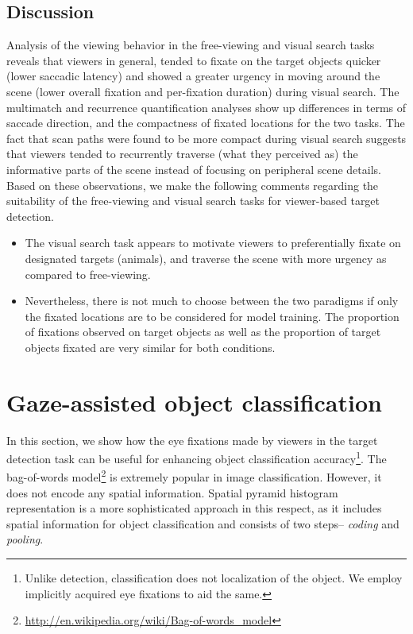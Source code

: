 \documentclass{article}
\begin{document}
\subsection{Discussion}
Analysis of the viewing behavior in the free-viewing and visual search tasks reveals that viewers in general, tended to fixate on the target objects quicker (lower saccadic latency) and showed a greater urgency in moving around the scene (lower overall fixation and per-fixation duration) during visual search. The multimatch and recurrence quantification analyses show up differences in terms of saccade direction, and the compactness of fixated locations for the two tasks. The fact that scan paths were found to be more compact during visual search suggests that viewers tended to recurrently traverse (what they perceived as) the informative parts of the scene instead of focusing on peripheral scene details. Based on these observations, we make the following comments regarding the suitability of the free-viewing and visual search tasks for viewer-based target detection. 

\begin{itemize}[noitemsep,nolistsep]
\item[1.] The visual search task appears to motivate viewers to preferentially fixate on designated targets (animals), and traverse the scene with more urgency as compared to free-viewing.
\item[2.] Nevertheless, there is not much to choose between the two paradigms if only the fixated locations are to be considered for model training. The proportion of fixations observed on target objects as well as the proportion of target objects fixated are very similar for both conditions.  
\end{itemize}
 

\section{Gaze-assisted object classification}\label{ML}

In this section, we show how the eye fixations made by viewers in the target detection task can be useful for enhancing object classification accuracy\footnote{Unlike detection, classification does not localization of the object. We employ implicitly acquired eye fixations to aid the same.}. The bag-of-words model\footnote{\url{http://en.wikipedia.org/wiki/Bag-of-words_model}} is extremely popular in image classification. However, it does not encode any spatial information. Spatial pyramid histogram representation is a more sophisticated approach in this respect, as it includes spatial information for object classification and consists of two steps-- \textit{coding} and \textit{pooling}.
\end{document}
